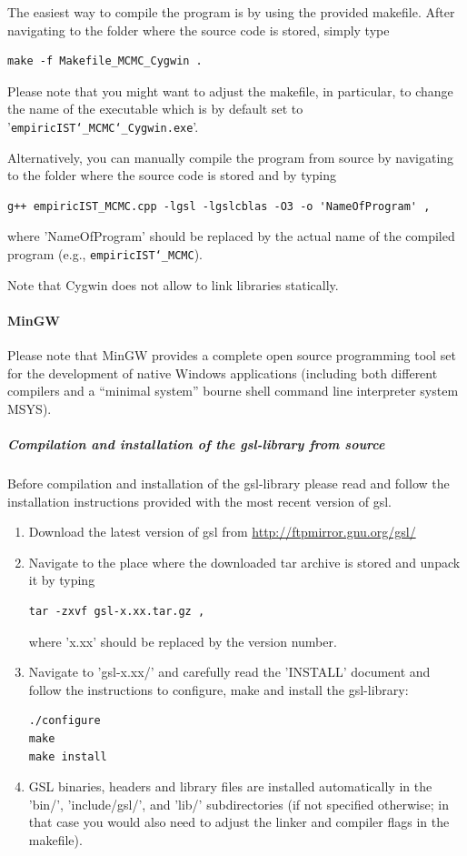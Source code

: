 \documentclass[12pt,a4paper]{scrartcl}
\begin{document}
The easiest way to compile the program is by using the provided makefile. After navigating to the folder where the source code is stored, simply type
\begin{lstlisting}
make -f Makefile_MCMC_Cygwin .
\end{lstlisting}
Please note that you might want to adjust the makefile, in particular, to change the name of the executable which is by default set to '\texttt{empiricIST\char`_MCMC\char`_Cygwin.exe}'.

Alternatively, you can manually compile the program from source by navigating to the folder where the source code is stored and by typing
\begin{lstlisting}
g++ empiricIST_MCMC.cpp -lgsl -lgslcblas -O3 -o 'NameOfProgram' ,
\end{lstlisting}
where 'NameOfProgram' should be replaced by the actual name of the compiled program (e.g., \texttt{empiricIST\char`_MCMC}). 

Note that Cygwin does not allow to link libraries statically.

\paragraph*{MinGW}
Please note that MinGW provides a complete open source programming tool set for the development of native Windows applications (including both different compilers and a ``minimal system'' bourne shell command line interpreter system MSYS).

\subparagraph{Compilation and installation of the gsl-library from source}
Before compilation and installation of the gsl-library please read and follow the installation instructions provided with the most recent version of gsl.

\begin{enumerate}
\item Download the latest version of gsl from \url{http://ftpmirror.gnu.org/gsl/}
\item Navigate to the place where the downloaded tar archive is stored and unpack it by typing 
\begin{lstlisting}
tar -zxvf gsl-x.xx.tar.gz ,
\end{lstlisting}
where 'x.xx' should be replaced by the version number.
\item Navigate to 'gsl-x.xx/' and carefully read the 'INSTALL' document and follow the instructions to configure, make and install the gsl-library:
\begin{lstlisting}
./configure
make
make install
\end{lstlisting}
\item GSL binaries, headers and library files are installed automatically in the 'bin/', 'include/gsl/', and 'lib/' subdirectories (if not specified otherwise; in that case you would also need to adjust the linker and compiler flags in the makefile).
\end{enumerate}
\end{document}
